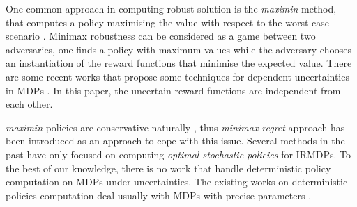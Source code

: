 

One common approach in computing robust solution is the \textit{maximin} method, that computes a policy maximising the value with respect to the worst-case scenario \cite{GIVAN2000,Iyengar2005,mastin2012,Nilim2005}. Minimax robustness can be considered as a game between two adversaries, one finds a policy with maximum values while the adversary chooses an instantiation of the reward functions that minimise the expected value. There are some recent works that propose some techniques for dependent uncertainties in MDPs \cite{Mannor2012,Wiesemann2013}. In this paper, the uncertain reward functions are independent from each other. 

\textit{maximin} policies are conservative naturally \cite{Delage2007}, thus \textit{minimax regret} approach \cite{Regan2009,Xu2009} has been introduced as an approach to cope with this issue. %
Several methods in the past \cite{Ahmed2017,Regan2009,Regan2010,Xu2009} have only focused on computing  \textit{optimal stochastic policies} for IRMDPs. %
To the best of our knowledge, there is no work that handle deterministic policy computation on MDPs under uncertainties. The existing works on deterministic policies computation deal usually with MDPs with precise parameters \cite{Dolgov2005,Montufar2015}. %